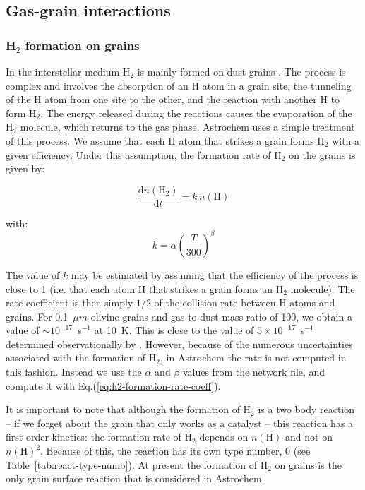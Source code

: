 \documentclass[a4paper,12pt]{article}
\newcommand{\conc}[1]{n(\mathrm{#1})}
\begin{document}
\subsection{Gas-grain interactions}
\label{sec:gas-grain-inter}

\subsubsection{H$_{2}$ formation on grains}
\label{sec:h_2-formation-grains}

In the interstellar medium H$_{2}$ is mainly formed on dust grains
\citep{Hollenbach71}. The process is complex and involves the
absorption of an H atom in a grain site, the tunneling of the H atom
from one site to the other, and the reaction with another H to form
H$_{2}$. The energy released during the reactions causes the
evaporation of the H$_{2}$ molecule, which returns to the gas
phase. Astrochem uses a simple treatment of this process.  We assume
that each H atom that strikes a grain forms H$_{2}$ with a given
efficiency. Under this assumption, the formation rate of H$_{2}$ on
the grains is given by:

\begin{equation}
  \frac{\mathrm{d} \conc{H_{2}}}{\mathrm{d} t} = k \, \conc{H}
  \label{eq:h2-formation-rate}
\end{equation}

\noindent
with:
\begin{equation}
  k = \alpha  \left( \frac{T}{300} \right)^\beta
  \label{eq:h2-formation-rate-coeff}
\end{equation}

The value of $k$ may be estimated by assuming that the efficiency of
the process is close to 1 (i.e. that each atom H that strikes a grain
forms an H$_{2}$ molecule). The rate coefficient is then simply $1/2$
of the collision rate between H atoms and grains. For 0.1~$\mu m$
olivine grains and gas-to-dust mass ratio of 100, we obtain a value of
$\sim 10^{-17}$~s$^{-1}$ at 10~K. This is close to the value of $5
\times 10^{-17}$~s$^{-1}$ determined observationally by
\citet{Jura74}. However, because of the numerous uncertainties
associated with the formation of H$_{2}$, in Astrochem the rate is not
computed in this fashion. Instead we use the $\alpha$ and $\beta$
values from the network file, and compute it with
Eq.(\ref{eq:h2-formation-rate-coeff}).

It is important to note that although the formation of H$_{2}$ is a
two body reaction -- if we forget about the grain that only works as a
catalyst -- this reaction has a first order kinetics: the formation
rate of H$_{2}$ depends on $\conc{H}$ and not on
$\conc{H}^{2}$. Because of this, the reaction has its own type number,
0 (see Table~\ref{tab:react-type-numb}). At present the formation of
H$_{2}$ on grains is the only grain surface reaction that is
considered in Astrochem.
\end{document}
